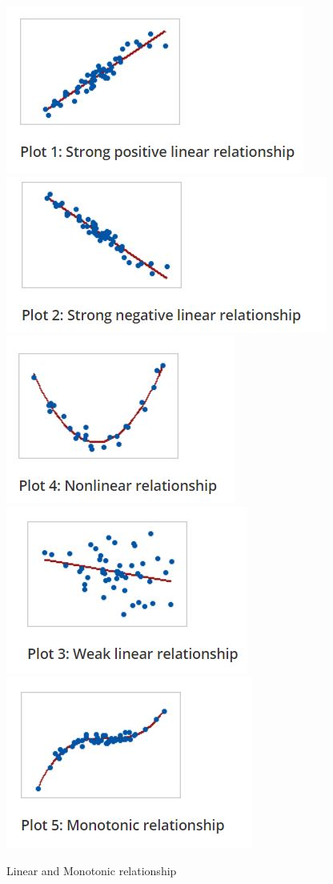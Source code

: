 \documentclass[
]{book}
\begin{document}
\begin{figure}

{\centering \includegraphics[width=0.49\linewidth]{images/image6c} \includegraphics[width=0.49\linewidth]{images/image7c} \includegraphics[width=0.49\linewidth]{images/image8c} \includegraphics[width=0.49\linewidth]{images/image9c} \includegraphics[width=0.49\linewidth]{images/image10c} 

}

\caption{Linear and Monotonic relationship}\label{fig:c6}
\end{figure}
\end{document}
